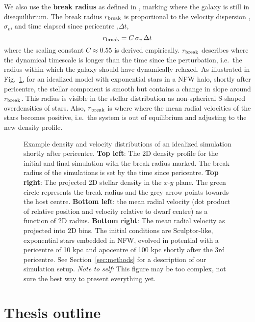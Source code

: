 We also use the \textbf{break radius} as defined in
\citet{penarrubia+2009}, marking where the galaxy is still in
disequilibrium. The break radius \(r_{\rm break}\) is proportional to
the velocity dispersion ,\(\sigma_v\), and time elapsed since pericentre
,\(\Delta t\), \begin{equation}{
r_{\rm break} = C\,\sigma_{v}\,\Delta t
}\end{equation} where the scaling constant \(C \approx 0.55\) is derived
empirically. \(r_{\rm break}\) describes where the dynamical timescale
is longer than the time since the perturbation, i.e.~the radius within
which the galaxy should have dynamically relaxed. As illustrated in
Fig.~\ref{fig:idealized_break_radius}, for an idealized model with
exponential stars in a NFW halo, shortly after pericentre, the stellar
component is smooth but contains a change in slope around
\(r_{\rm break}\). This radius is visible in the stellar distribution as
non-spherical S-shaped overdensities of stars. Also, \(r_{\rm break}\)
is where where the mean radial velocities of the stars becomes positive,
i.e.~the system is out of equilibrium and adjusting to the new density
profile.

\begin{figure}
\centering
{}
\caption[Break radius validation]{Example density and velocity
distributions of an idealized simulation shortly after pericentre.
\textbf{Top left}: The 2D density profile for the initial and final
simulation with the break radius marked. The break radius of the
simulations is set by the time since pericentre. \textbf{Top right}: The
projected 2D stellar density in the \(x\)-\(y\) plane. The green circle
represents the break radius and the grey arrow points towards the host
centre. \textbf{Bottom left}: the mean radial velocity (dot product of
relative position and velocity relative to dwarf centre) as a function
of 2D radius. \textbf{Bottom right}: The mean radial velocity as
projected into 2D bins. The initial conditions are Sculptor-like,
exponential stars embedded in NFW, evolved in \citet{EP2020} potential
with a pericentre of 10 kpc and apocentre of 100 kpc shortly after the
3rd pericentre. See Section~\ref{sec:methods} for a description of our
simulation setup. \emph{Note to self:} This figure may be too complex,
not sure the best way to present everything
yet.}\label{fig:idealized_break_radius}
\end{figure}

\section{Thesis outline}\label{thesis-outline}

